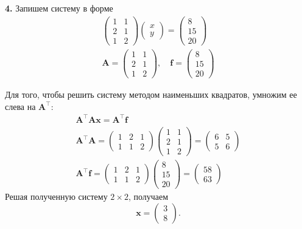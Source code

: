 \documentclass[12pt]{article}
\renewcommand{\vec}[1]{\boldsymbol{\mathbf{#1}}}
\begin{document}
\textbf{4.} Запишем систему в форме
\begin{gather*}
\begin{pmatrix}
1 & 1\\
2 & 1\\
1 & 2
\end{pmatrix}
\begin{pmatrix}
x\\y
\end{pmatrix}
=
\begin{pmatrix}
8 \\ 15 \\ 20
\end{pmatrix}\\
\vec A = \begin{pmatrix}
1 & 1\\
2 & 1\\
1 & 2
\end{pmatrix}, \quad 
\vec f = \begin{pmatrix}
8 \\ 15 \\ 20
\end{pmatrix}
\end{gather*}

Для того, чтобы решить систему методом наименьших квадратов, умножим ее слева на $\vec A^\top$:
\begin{gather*}
\vec A^\top \vec A \vec x = \vec A^\top \vec f\\
\vec A^\top \vec A = 
\begin{pmatrix}
1 & 2 & 1\\
1 & 1 & 2
\end{pmatrix}
\begin{pmatrix}
1 & 1\\
2 & 1\\
1 & 2
\end{pmatrix} = 
\begin{pmatrix}
6 & 5\\
5 & 6
\end{pmatrix}\\
\vec A^\top \vec f = 
\begin{pmatrix}
1 & 2 & 1\\
1 & 1 & 2
\end{pmatrix}
\begin{pmatrix}
8\\15\\20
\end{pmatrix} = 
\begin{pmatrix}
58\\63
\end{pmatrix}
\end{gather*}
Решая полученную систему $2 \times 2$, получаем
\[
\vec x = \begin{pmatrix}
3 \\ 8
\end{pmatrix}.
\]
\end{document}
